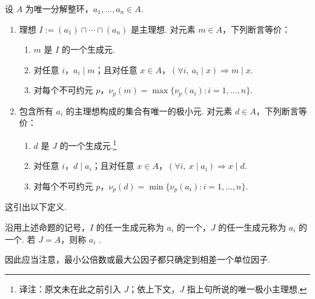 \begin{proposition*}\hypertarget{galois-gcd-lcm-proposition}{}
设 $A$ 为唯一分解整环，$a_1,\ldots,a_n\in A$.
\begin{enumerate}[label=\roman*)]
\item 理想 $I:=(a_1)\cap\cdots\cap(a_n)$ 是主理想. 对元素 $m\in A$，下列断言等价：
\begin{enumerate}[label=(\alph*)]
\item $m$ 是 $I$ 的一个生成元.
\item 对任意 $i$，$a_i\mid m$；且对任意 $x\in A$，$(\forall i,\ a_i\mid x)\Rightarrow m\mid x$.
\item 对每个不可约元 $p$，$\nu_p(m)=\max\{\nu_p(a_i):i=1,\ldots,n\}$.
\end{enumerate}
\item 包含所有 $a_i$ 的主理想构成的集合有唯一的极小元. 对元素 $d\in A$，下列断言等价：
\begin{enumerate}[label=(\alph*)]
\item $d$ 是 $J$ 的一个生成元.\footnote{译注：原文未在此之前引入 $J$；依上下文，$J$ 指上句所说的唯一极小主理想.}
\item 对任意 $i$，$d\mid a_i$；且对任意 $x\in A$，$(\forall i,\ x\mid a_i)\Rightarrow x\mid d$.
\item 对每个不可约元 $p$，$\nu_p(d)=\min\{\nu_p(a_i):i=1,\ldots,n\}$.
\end{enumerate}
\end{enumerate}
\end{proposition*}
这引出以下定义.
\begin{definition*}
沿用上述命题的记号，$I$ 的任一生成元称为 $a_i$ 的一个，$J$ 的任一生成元称为 $a_i$ 的一个. 若 $J=A$，则称 $a_i$ .
\end{definition*}
因此应当注意，最小公倍数或最大公因子都只确定到相差一个单位因子.

